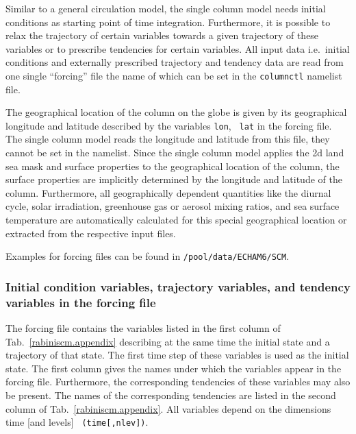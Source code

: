 \begin{appendix}
Similar to a general circulation model, the single column model 
needs initial 
conditions as starting point of time integration. Furthermore, it is
possible to relax the trajectory of certain variables towards a given
trajectory of these variables or to prescribe tendencies for certain
variables. All input data i.e.~initial conditions and externally
prescribed trajectory and tendency data are read from one single ``forcing''
file the name of 
which can be set in the {\tt columnctl} namelist file. 

The geographical location of the column on the globe is given by its
geographical longitude and latitude described by the variables {\tt lon}, {\tt 
  lat} in the forcing file. The single column model reads the
longitude and latitude from this file, they cannot be set in the namelist.
Since the single column model applies the 2d land sea mask and surface
properties to the geographical location of the column, the surface
properties are implicitly determined by the longitude and latitude of
the column. Furthermore, all geographically dependent quantities like
the diurnal cycle, solar irradiation, greenhouse 
gas or aerosol mixing ratios, and sea surface temperature are
automatically calculated for this special geographical location or
extracted from the respective \echam{} input files.

Examples for forcing files can be found in {\tt /pool/data/ECHAM6/SCM}.

\subsubsection{Initial condition variables, trajectory variables, and
  tendency variables in the forcing file}

The forcing file contains the variables listed in the first column of
Tab.~\ref{rabiniscm.appendix} 
describing at the same time the
initial state and a trajectory of that state. The first time step of
these variables is used as the initial state.
The first column gives the names under which the
variables appear in 
the forcing file. Furthermore, the corresponding tendencies of these
variables may also be present. The names of the corresponding
tendencies are listed 
in the second column of Tab.~\ref{rabiniscm.appendix}. 
All variables depend on the dimensions time [and levels] {\tt
  (time[,nlev])}. 

\setlength{\LTcapwidth}{\textwidth}
\setlength{\LTleft}{0pt}\setlength{\LTright}{0pt}


\end{appendix}
